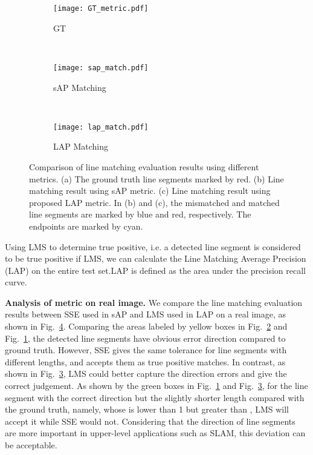 \documentclass[runningheads]{llncs}
\begin{document}
\begin{figure}[t]
\begin{center}
     \begin{subfigure}[b]{0.23\textwidth}
         \centering
         \texttt{[image: GT\_metric.pdf]}
         \caption{GT}
         \label{sub_fig:gt_match}
     \end{subfigure}
     ~~
     \begin{subfigure}[b]{0.23\textwidth}
         \centering
         \texttt{[image: sap\_match.pdf]}
         \caption{sAP Matching}
         \label{sub_fig:sap_match}
     \end{subfigure}
    ~~
     \begin{subfigure}[b]{0.23\textwidth}
         \centering
         \texttt{[image: lap\_match.pdf]}
         \caption{LAP Matching}
         \label{sub_fig:lap_match}
     \end{subfigure}

   \end{center}
    \caption{Comparison of line matching evaluation results using different metrics. (a) The ground truth line segments marked by red. (b) Line matching result using sAP metric. (c) Line matching result using proposed LAP metric. In (b) and (c), the mismatched and matched line segments are marked by blue and red, respectively. The endpoints are marked by cyan.}
    \label{metric_match}
\end{figure}

Using LMS to determine true positive, i.e. a detected line segment is considered to be true positive if LMS, we can calculate the Line Matching Average Precision (LAP) on the entire test set.LAP is defined as the area under the precision recall curve. 

\textbf{Analysis of metric on real image.} We compare the line matching evaluation results between SSE used in sAP and LMS used in LAP on a real image, as shown in Fig.~\ref{metric_match}. Comparing the areas labeled by yellow boxes in Fig.~\ref{sub_fig:sap_match} and Fig.~\ref{sub_fig:gt_match}, the detected line segments have obvious error direction compared to ground truth. However, SSE gives the same tolerance for line segments with different lengths, and accepts them as true positive matches. In contrast, as shown in Fig.~\ref{sub_fig:lap_match}, LMS could better capture the direction errors and give the correct judgement. As shown by the green boxes in Fig.~\ref{sub_fig:gt_match} and Fig.~\ref{sub_fig:lap_match}, for the line segment with the correct direction but the slightly shorter length compared with the ground truth, namely, whose  is lower than 1 but greater than , LMS will accept it while SSE would not. Considering that the direction of line segments are more important in upper-level applications such as SLAM, this deviation can be acceptable.
\end{document}
